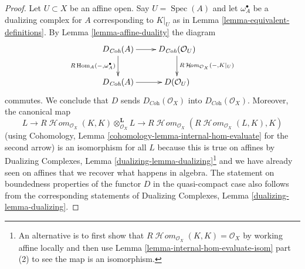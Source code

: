 \documentclass[10pt,a4paper]{amsart}
\theoremstyle{plain}
\theoremstyle{definition}
\theoremstyle{remark}
\numberwithin{equation}{subsection}
\def\Spec{\mathop{\mathrm{Spec}}}
\def\Hom{\mathop{\mathrm{Hom}}\nolimits}
\def\SheafHom{\mathop{\mathcal{H}\!\mathit{om}}\nolimits}
\begin{document}
\begin{proof}
Let $U \subset X$ be an affine open. Say $U = \Spec(A)$ and
let $\omega_A^\bullet$ be a dualizing complex for $A$
corresponding to $K|_U$
as in Lemma \ref{lemma-equivalent-definitions}.
By Lemma \ref{lemma-affine-duality} the diagram
$$
\xymatrix{
D_{\textit{Coh}}(A) \ar[r] \ar[d]_{R\Hom_A(-, \omega_A^\bullet)} &
D_{\textit{Coh}}(\mathcal{O}_U) \ar[d]^{R\SheafHom_{\mathcal{O}_X}(-, K|_U)} \\
D_{\textit{Coh}}(A) \ar[r] &
D(\mathcal{O}_U)
}
$$
commutes. We conclude that $D$ sends $D_{\textit{Coh}}(\mathcal{O}_X)$ into
$D_{\textit{Coh}}(\mathcal{O}_X)$. Moreover, the canonical map
$$
L
\longrightarrow
R\SheafHom_{\mathcal{O}_X}(K, K) \otimes_{\mathcal{O}_X}^\mathbf{L} L
\longrightarrow
R\SheafHom_{\mathcal{O}_X}(R\SheafHom_{\mathcal{O}_X}(L, K), K)
$$
(using Cohomology, Lemma \ref{cohomology-lemma-internal-hom-evaluate}
for the second arrow)
is an isomorphism for all $L$ because this is true on affines by
Dualizing Complexes, Lemma \ref{dualizing-lemma-dualizing}\footnote{An
alternative is to first show that
$R\SheafHom_{\mathcal{O}_X}(K, K) = \mathcal{O}_X$ by
working affine locally and then use
Lemma \ref{lemma-internal-hom-evaluate-isom} part (2)
to see the map is an isomorphism.}
and we have already seen on affines that we recover what
happens in algebra.
The statement on boundedness properties of the functor $D$
in the quasi-compact case also follows from the corresponding
statements of Dualizing Complexes, Lemma \ref{dualizing-lemma-dualizing}.
\end{proof}
\end{document}

